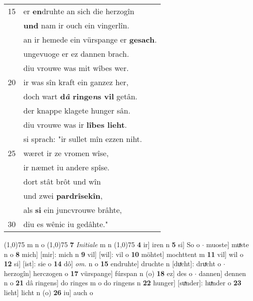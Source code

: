 \documentclass[8pt,a4paper,notitlepage]{article}
\begin{document}
\begin{table}[ht]
\begin{minipage}[t]{0.5\linewidth}
\begin{tabular}{rl}
15 & er \textbf{en}druhte an sich die herzogîn\\ 
 & \textbf{und} nam ir ouch ein vingerlîn.\\ 
 & an ir hemede ein vürspange er \textbf{gesach}.\\ 
 & ungevuoge er ez dannen brach.\\ 
 & diu vrouwe was mit wîbes wer.\\ 
20 & ir was sîn kraft ein ganzez her,\\ 
 & doch wart \textbf{d\textit{â} ringe\textit{n}s vil} getân.\\ 
 & der knappe klagete hunger sân.\\ 
 & diu vrouwe was ir \textbf{lîbes lieht}.\\ 
 & si sprach: "ir sullet mîn ezzen niht.\\ 
25 & wæret ir ze vromen wîse,\\ 
 & ir næmet iu andere spîse.\\ 
 & dort stât brôt und wîn\\ 
 & und zwei \textbf{pardrîsekîn},\\ 
 & als \textbf{si} ein juncvrouwe brâhte,\\ 
30 & diu es wênic iu gedâhte."\\ 
\end{tabular}
\scriptsize
\line(1,0){75} \newline
m n o \newline
\line(1,0){75} \newline
\textbf{7} \textit{Initiale} m n  \newline
\line(1,0){75} \newline
\textbf{4} ir] iren n \textbf{5} si] So o  $\cdot$ muoste] muͯste n o \textbf{8} mich] [mir]: mich n \textbf{9} vil] [wil]: vil o \textbf{10} möhtet] mochttent m \textbf{11} vil] wil o \textbf{12} si] [ist]: sie o \textbf{14} dô] \textit{om.} n o \textbf{15} endruhte] druchte n [duͯcht]: druͯcht o  $\cdot$ herzogîn] herczogen o \textbf{17} vürspange] fúrspan n (o) \textbf{18} ez] des o  $\cdot$ dannen] dennen n o \textbf{21} dâ ringens] do ringes m o do ringens n \textbf{22} hunger] [suͯnder]: huͯnder o \textbf{23} lieht] licht n (o) \textbf{26} iu] auch o \newline
\end{minipage}
\end{table}
\newpage
\end{document}
